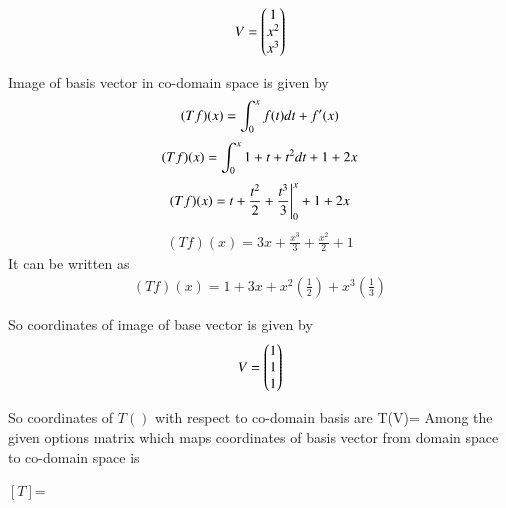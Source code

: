 \documentclass[journal,12pt,twocolumn]{IEEEtran}
\begin{document}
\begin{align}
    V=\begin{pmatrix}1\\x^2\\x^3\end{pmatrix}
\end{align}

Image of basis vector in co-domain space is given by \newline
\begin{align}
(Tf)(x)=\int_{0}^{x} f(t)dt+f'(x)\newline
\end{align}
\begin{align}
(Tf)(x)=\int_{0}^{x} 1+t+t^2 dt+ 1+2x\newline
\end{align}
\begin{align}
(Tf)(x)=t+\frac{t^2}{2}+\frac{t^3}{3}\Biggr|_{0}^{x}+1+2x\newline
\end{align}
\begin{align}
(Tf)(x)=3x+\frac{x^3}{3}+\frac{x^2}{2}+1
\end{align}
It can be written as 
\begin{align}
(Tf)(x)=1+3x+x^2(\frac{1}{2}) +x^3(\frac{1}{3}) 
\end{align}

So coordinates of image of base vector is given by 
\begin{align}
    V=\begin{pmatrix}1\\1\\1\end{pmatrix}
\end{align}


So coordinates of $T()$ with respect to co-domain basis are T(V)= 
\newline
\newpage
Among the given options matrix which maps coordinates of basis vector from domain space
to co-domain space is

$[T]$=
\end{document}
